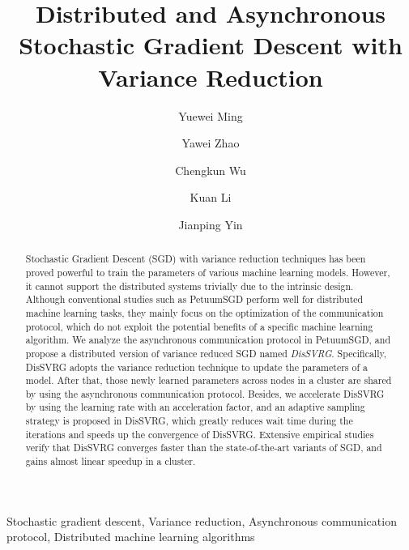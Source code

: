 \documentclass[preprint,review,11pt,a4paper]{elsarticle}
\begin{document}
\begin{frontmatter}

\title{Distributed and Asynchronous Stochastic Gradient Descent with Variance Reduction}

\author[mymainaddress]{Yuewei Ming}

\author[mymainaddress]{Yawei Zhao}
\author[mymainaddress]{Chengkun Wu}
\author[mymainaddress]{Kuan Li}
\author[mysecondaryaddress]{Jianping Yin}
\address[mymainaddress]{College of Computer,\\ National University of Defense Technology, Changsha 410073, China}
\address[mysecondaryaddress]{State Key Laboratory of High Performance Computing,\\ National University of Defense Technology, Changsha, 410073, China}

\begin{abstract}
Stochastic Gradient Descent (SGD) with variance reduction techniques has been proved powerful to train the parameters of various machine learning models. However, it cannot support the distributed systems trivially due to the intrinsic design.  Although conventional studies such as PetuumSGD perform well for distributed machine learning tasks, they mainly focus on the optimization of the communication protocol, which do not exploit the potential benefits of a specific machine learning algorithm. We analyze the asynchronous communication protocol in PetuumSGD, and propose a distributed version of variance reduced SGD named \emph{DisSVRG}. Specifically, DisSVRG adopts the variance reduction technique to update the parameters of a model. After that,  those newly learned parameters across nodes in a cluster are shared by using the asynchronous communication protocol. Besides, we accelerate DisSVRG by using the learning rate with an acceleration factor, and an adaptive sampling strategy is proposed in DisSVRG, which greatly reduces wait time during the iterations and speeds up the convergence of DisSVRG. Extensive empirical studies verify that DisSVRG  converges faster than the state-of-the-art variants of SGD, and gains almost linear speedup in a cluster.
\end{abstract}

\begin{keyword}
Stochastic gradient descent, Variance reduction, Asynchronous communication protocol, Distributed machine learning algorithms
\end{keyword}

\end{frontmatter}
\end{document}
